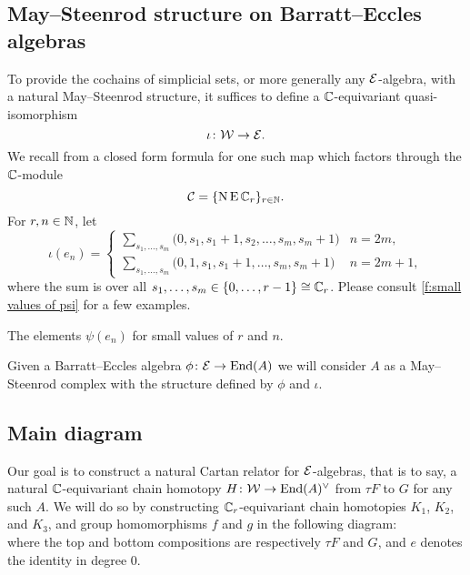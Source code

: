 \subsection{May--Steenrod structure on Barratt--Eccles algebras}\label{ss:may-steenrod on barratt-eccles}

To provide the cochains of simplicial sets, or more generally any $\mathcal{E}$-algebra, with a natural May--Steenrod structure, it suffices to define a $\mathbb{C}$-equivariant quasi-isomorphism
\[
\iota \colon \mathcal{W} \to \mathcal{E}.
\]
We recall from \cite{medina2021may_st} a closed form formula for one such map which factors through the $\mathbb{C}$-module
\[
\mathcal{C} = \{\operatorname{N}\operatorname{E}\mathbb{C}_r\}_{r\in\mathbb{N}}.
\]
For $r,n\in\mathbb{N}$, let
\begin{equation*}
	\iota(e_{n}) =
	\begin{cases}
		\displaystyle{\sum_{s_1, \dots, s_m}} \big(0, {s_1}, {s_1+1}, {s_2}, \dots, {s_{m}}, {s_{m}+1} \big) & n = 2m, \\
		\displaystyle{\sum_{s_1, \dots, s_m}} \big(0, 1, {s_1}, {s_1+1}, \dots, {s_{m}}, {s_{m}+1} \big) & n = 2m+1,
	\end{cases}
\end{equation*}
where the sum is over all $s_1, \dots, s_m \in \{0, \dots, r-1\} \cong \mathbb{C}_r$.
Please consult \cref{f:small values of psi} for a few examples.

\begin{table}
	\centering
	
	\caption{The elements $\psi(e_n)$ for small values of $r$ and $n$.}
	\label{f:small values of psi}
\end{table}

Given a Barratt--Eccles algebra $\phi \colon \mathcal{E} \to \mathrm{End}(A)$ we will consider $A$ as a May--Steenrod complex with the structure defined by $\phi$ and $\iota$.

\subsection{Main diagram}

Our goal is to construct a natural Cartan relator for $\mathcal{E}$-algebras, that is to say, a natural $\mathbb{C}$-equivariant chain homotopy $H \colon \mathcal{W} \to \mathrm{End}(A)^\vee$ from $\tau F$ to $G$ for any such $A$.
We will do so by constructing $\mathbb{C}_r$-equivariant chain homotopies $K_1$, $K_2$, and $K_3$, and group homomorphisms $f$ and $g$ in the following diagram:
\begin{equation}\label{d:big diagram}
	
\end{equation}
where the top and bottom compositions are respectively $\tau F$ and $G$, and $e$ denotes the identity in degree $0$.

